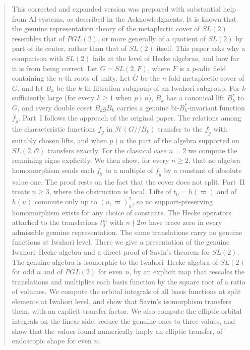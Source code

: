 \documentclass[12pt,letterpaper]{amsart}
\numberwithin{equation}{section}
\theoremstyle{definition}
\theoremstyle{remark}
\newcommand{\cO}{\mathcal{O}}
\newcommand{\cH}{\mathcal{H}}
\newcommand{\Gbar}{\overline{G}}
\newcommand{\fbar}{\overline{f}}
\newcommand{\Hlin}{\cH(G/\!/B_k)}
\begin{document}
\begin{abstract}
This corrected and expanded version was prepared with substantial help
from AI systems, as described in the Acknowledgments.
It is known that the genuine representation theory of the metaplectic
cover of $SL(2)$ resembles that of $PGL(2)$, or more generally of a
quotient of $SL(2)$ by part of its center, rather than that of $SL(2)$
itself. This paper asks why a comparison with $SL(2)$ fails at the level
of Hecke algebras, and how far it is from being correct.
Let $G=SL(2,F)$, where $F$ is a $p$-adic field containing the $n$-th
roots of unity. Let $\Gbar$ be the $n$-fold metaplectic cover of $G$,
and let $B_k$ be the $k$-th filtration subgroup of an Iwahori subgroup.
For $k$ sufficiently large (for every $k\geq 1$ when $p\nmid n$), $B_k$
has a canonical lift $B_k^*$ to $\Gbar$, and every double coset
$B_kgB_k$ carries a genuine bi-$B_k^*$-invariant function
$\fbar_{\tilde g}$. Part~I follows the approach of the original paper.
The relations among the characteristic functions $f_g$ in $\Hlin$
transfer to the $\fbar_{\tilde g}$ with suitably chosen lifts, and when
$p\nmid n$ the part of the algebra supported on $SL(2,\cO)$ transfers
exactly. For the classical case $n=2$ we compute the remaining signs
explicitly. We then show, for every $n\geq 2$, that no algebra
homomorphism sends each $f_g$ to a multiple of $\fbar_{\tilde g}$ by a
constant of absolute value one. The proof rests on the fact that the
cover does not split. Part~II treats $n\geq 3$, where the obstruction
is local. Lifts of $t_0=h(\varpi)$ and of $h(u)$ commute only up to
$(u,\varpi)_n^{2}$, so no support-preserving homomorphism exists for
any choice of constants. The Hecke operators attached to the
translations $t_0^m$ with $n\nmid 2m$ have trace zero in every
admissible genuine representation. The same translations carry no
genuine functions at Iwahori level. There we give a presentation of the
genuine Iwahori--Hecke algebra and a direct proof of Savin's theorem
for $SL(2)$. The genuine algebra is isomorphic to the Iwahori--Hecke
algebra of $SL(2)$ for odd $n$ and of $PGL(2)$ for even $n$, by an
explicit map that rescales the translations and multiplies each basis
function by the square root of a ratio of volumes. We compute the
orbital integrals of all basis functions at split elements at Iwahori
level, and show that Savin's isomorphism transfers them, with an
explicit transfer factor. We also compute the elliptic orbital integrals
on the linear side, reduce the genuine ones to three values, and show
that the values found numerically imply an elliptic transfer, of
endoscopic shape for even $n$.
\end{abstract}
\end{document}
